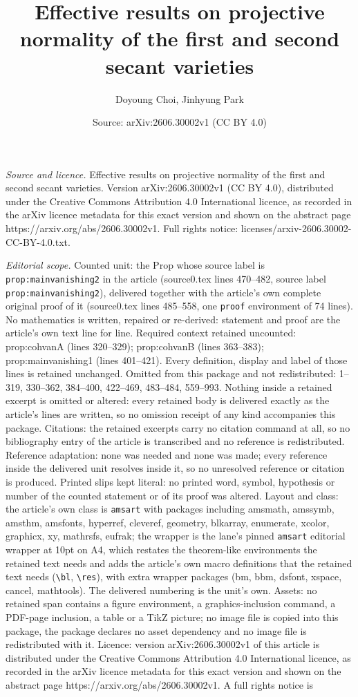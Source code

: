 \documentclass[10pt,a4paper]{amsart}
\title[Effective results on projective normality of the first and s]{Effective results on projective normality of the first and second secant varieties}
\author{Doyoung Choi, Jinhyung Park}
\date{Source: arXiv:2606.30002v1 (CC BY 4.0)}
\begin{document}
\maketitle

\noindent\emph{Source and licence.} Effective results on projective normality of the first and second secant varieties. Version arXiv:2606.30002v1 (CC BY 4.0), distributed under the Creative Commons Attribution 4.0 International licence, as recorded in the arXiv licence metadata for this exact version and shown on the abstract page https://arxiv.org/abs/2606.30002v1. Full rights notice: licenses/arxiv-2606.30002-CC-BY-4.0.txt.\par\smallskip

\noindent\textit{Editorial scope.} Counted unit: the Prop whose source label is \texttt{prop:mainvanishing2} in the article (source0.tex lines 470--482, source label \texttt{prop:mainvanishing2}), delivered together with the article's own complete original proof of it (source0.tex lines 485--558, one \texttt{proof} environment of 74 lines). No mathematics is written, repaired or re-derived: statement and proof are the article's own text line for line. Required context retained uncounted: prop:cohvanA (lines 320--329); prop:cohvanB (lines 363--383); prop:mainvanishing1 (lines 401--421). Every definition, display and label of those lines is retained unchanged. Omitted from this package and not redistributed: 1--319, 330--362, 384--400, 422--469, 483--484, 559--993. Nothing inside a retained excerpt is omitted or altered: every retained body is delivered exactly as the article's lines are written, so no omission receipt of any kind accompanies this package. Citations: the retained excerpts carry no citation command at all, so no bibliography entry of the article is transcribed and no reference is redistributed. Reference adaptation: none was needed and none was made; every reference inside the delivered unit resolves inside it, so no unresolved reference or citation is produced. Printed slips kept literal: no printed word, symbol, hypothesis or number of the counted statement or of its proof was altered. Layout and class: the article's own class is \texttt{amsart} with packages including amsmath, amssymb, amsthm, amsfonts, hyperref, cleveref, geometry, blkarray, enumerate, xcolor, graphicx, xy, mathrsfs, eufrak; the wrapper is the lane's pinned \texttt{amsart} editorial wrapper at 10pt on A4, which restates the theorem-like environments the retained text needs and adds the article's own macro definitions that the retained text needs (\texttt{\textbackslash bl}, \texttt{\textbackslash res}), with extra wrapper packages (bm, bbm, dsfont, xspace, cancel, mathtools). The delivered numbering is the unit's own. Assets: no retained span contains a figure environment, a graphics-inclusion command, a PDF-page inclusion, a table or a TikZ picture; no image file is copied into this package, the package declares no asset dependency and no image file is redistributed with it. Licence: version arXiv:2606.30002v1 of this article is distributed under the Creative Commons Attribution 4.0 International licence, as recorded in the arXiv licence metadata for this exact version and shown on the abstract page https://arxiv.org/abs/2606.30002v1. A full rights notice is 
\end{document}
